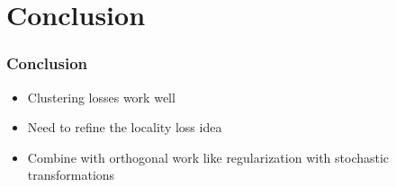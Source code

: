 \section{Conclusion}
\begin{frame}
	\frametitle{Conclusion}
	\begin{itemize}
		\item Clustering losses work well
		\item Need to refine the locality loss idea
		\item Combine with orthogonal work like regularization with stochastic transformations
	\end{itemize}
\end{frame}

